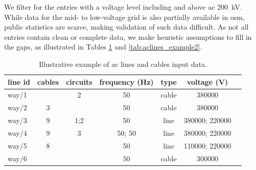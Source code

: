 \documentclass[fleqn,10pt]{wlscirep}
\begin{document}
We filter for the entries with a voltage level including and above \acrshort{ac} \SI{200}{\kilo\volt}. While data for the mid- to low-voltage grid is also partially available in \gls{osm}, public statistics are scarce, making validation of such data difficult. As not all entries contain clean or complete data, we make heuristic assumptions to fill in the gaps, as illustrated in Tables \ref{tab:aclines_example1} and \ref{tab:aclines_example2}. 

\begin{table}[!htbp]
    \centering
    \begin{tabular}{|l|c|c|c|c|c|c|}
    \hline
    \textbf{line id} & \textbf{cables} & \textbf{circuits} & \textbf{frequency} (Hz) & \textbf{type} & \textbf{voltage}  (V) \\
    \hline
    way/1 &  & 2 & 50 & cable & \SI{380000}{} \\
    \hline
    way/2 & 3 &  & 50 & cable & \SI{380000}{} \\
    \hline
    way/3 & 9 & 1;2 & 50 & line & \SI{380000}{}; \SI{220000}{} \\
    \hline
    way/4 & 9 & 3 & 50; 50 & line & \SI{380000}{}; \SI{220000}{} \\
    \hline
    way/5 & 8 &  & 50 & line & \SI{110000}{}; \SI{220000}{} \\
    \hline
    way/6 &  &  & 50 & cable & \SI{300000}{}\\
    \hline
    \end{tabular}
    \caption{Illustrative example of \acrshort{ac} lines and cables input data.}
    \label{tab:aclines_example1}
\end{table}
\end{document}
